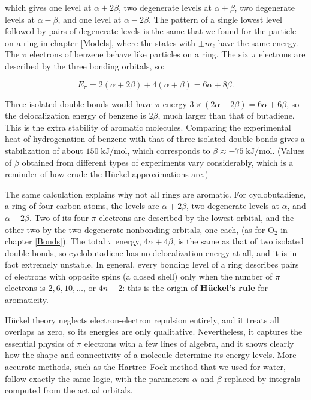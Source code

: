 \documentclass[
  english,
  9pt,
]{extbook}
\theoremstyle{definition}
\theoremstyle{definition}
\theoremstyle{definition}
\theoremstyle{definition}
\theoremstyle{remark}
\begin{document}
which gives one level at \(\alpha+2\beta\), two degenerate levels at \(\alpha+\beta\), two degenerate levels at \(\alpha-\beta\), and one level at \(\alpha-2\beta\). The pattern of a single lowest level followed by pairs of degenerate levels is the same that we found for the particle on a ring in chapter \ref{Models}, where the states with \(\pm m_\ell\) have the same energy. The \(\pi\) electrons of benzene behave like particles on a ring. The six \(\pi\) electrons are described by the three bonding orbitals, so:

\begin{equation}
E_\pi = 2(\alpha+2\beta) + 4(\alpha+\beta) = 6\alpha+8\beta.
\label{eq:huckel7}
\end{equation}

Three isolated double bonds would have \(\pi\) energy \(3\times(2\alpha+2\beta)=6\alpha+6\beta\), so the delocalization energy of benzene is \(2\beta\), much larger than that of butadiene. This is the extra stability of aromatic molecules. Comparing the experimental heat of hydrogenation of benzene with that of three isolated double bonds gives a stabilization of about \(150\;\text{kJ/mol}\), which corresponds to \(\beta\approx-75\;\text{kJ/mol}\). (Values of \(\beta\) obtained from different types of experiments vary considerably, which is a reminder of how crude the Hückel approximations are.)

The same calculation explains why not all rings are aromatic. For cyclobutadiene, a ring of four carbon atoms, the levels are \(\alpha+2\beta\), two degenerate levels at \(\alpha\), and \(\alpha-2\beta\). Two of its four \(\pi\) electrons are described by the lowest orbital, and the other two by the two degenerate nonbonding orbitals, one each, (as for \(\mathrm{O}_2\) in chapter \ref{Bonds}). The total \(\pi\) energy, \(4\alpha+4\beta\), is the same as that of two isolated double bonds, so cyclobutadiene has no delocalization energy at all, and it is in fact extremely unstable. In general, every bonding level of a ring describes pairs of electrons with opposite spins (a closed shell) only when the number of \(\pi\) electrons is \(2, 6, 10, \ldots\), or \(4n+2\): this is the origin of \textbf{Hückel's rule} for aromaticity.

Hückel theory neglects electron-electron repulsion entirely, and it treats all overlaps as zero, so its energies are only qualitative. Nevertheless, it captures the essential physics of \(\pi\) electrons with a few lines of algebra, and it shows clearly how the shape and connectivity of a molecule determine its energy levels. More accurate methods, such as the Hartree--Fock method that we used for water, follow exactly the same logic, with the parameters \(\alpha\) and \(\beta\) replaced by integrals computed from the actual orbitals.
\end{document}
